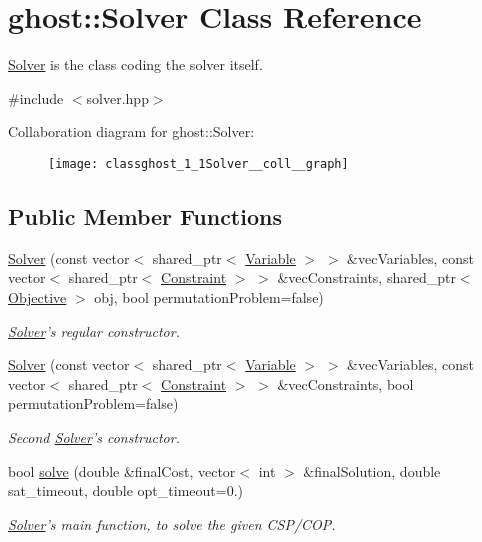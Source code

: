 \hypertarget{classghost_1_1Solver}{\section{ghost\-:\-:Solver Class Reference}
\label{classghost_1_1Solver}
}


\hyperlink{classghost_1_1Solver}{Solver} is the class coding the solver itself.  




{\ttfamily \#include $<$solver.\-hpp$>$}



Collaboration diagram for ghost\-:\-:Solver\-:
\nopagebreak
\begin{figure}[H]
\begin{center}
\leavevmode
\texttt{[image: classghost\_1\_1Solver\_\_coll\_\_graph]}
\end{center}
\end{figure}
\subsection*{Public Member Functions}
\begin{DoxyCompactItemize}
\item 
\hyperlink{classghost_1_1Solver_add6b5ac4ab56aa685e70a02c6a56317a}{Solver} (const vector$<$ shared\-\_\-ptr$<$ \hyperlink{classghost_1_1Variable}{Variable} $>$ $>$ \&vec\-Variables, const vector$<$ shared\-\_\-ptr$<$ \hyperlink{classghost_1_1Constraint}{Constraint} $>$ $>$ \&vec\-Constraints, shared\-\_\-ptr$<$ \hyperlink{classghost_1_1Objective}{Objective} $>$ obj, bool permutation\-Problem=false)
\begin{DoxyCompactList}\small\item\em \hyperlink{classghost_1_1Solver}{Solver}'s regular constructor. \end{DoxyCompactList}\item 
\hyperlink{classghost_1_1Solver_a8d21b70c31b1b2de701599b1794dfc59}{Solver} (const vector$<$ shared\-\_\-ptr$<$ \hyperlink{classghost_1_1Variable}{Variable} $>$ $>$ \&vec\-Variables, const vector$<$ shared\-\_\-ptr$<$ \hyperlink{classghost_1_1Constraint}{Constraint} $>$ $>$ \&vec\-Constraints, bool permutation\-Problem=false)
\begin{DoxyCompactList}\small\item\em Second \hyperlink{classghost_1_1Solver}{Solver}'s constructor. \end{DoxyCompactList}\item 
bool \hyperlink{classghost_1_1Solver_acc72c5a651e888858c10dfe300d96fa8}{solve} (double \&final\-Cost, vector$<$ int $>$ \&final\-Solution, double sat\-\_\-timeout, double opt\-\_\-timeout=0.)
\begin{DoxyCompactList}\small\item\em \hyperlink{classghost_1_1Solver}{Solver}'s main function, to solve the given C\-S\-P/\-C\-O\-P. \end{DoxyCompactList}\end{DoxyCompactItemize}


